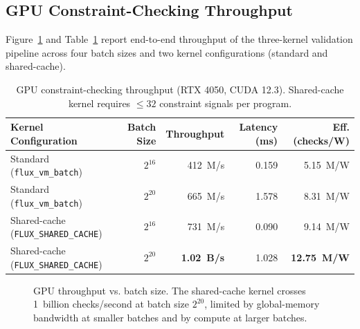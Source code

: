 \documentclass[sigplan,review,anonymous]{acmart}
\begin{document}
\subsection{GPU Constraint-Checking Throughput}
\label{sec:eval-gpu}

Figure~\ref{fig:gpu-throughput} and Table~\ref{tab:gpu-throughput} report
end-to-end throughput of the three-kernel validation pipeline across four
batch sizes and two kernel configurations (standard and shared-cache).

\begin{table}[t]
\centering
\caption{GPU constraint-checking throughput (RTX 4050, CUDA 12.3).
Shared-cache kernel requires $\le 32$ constraint signals per program.}
\label{tab:gpu-throughput}
\renewcommand{\arraystretch}{1.15}
\begin{tabular}{lrrrr}
\toprule
\textbf{Kernel Configuration} & \textbf{Batch Size} & \textbf{Throughput} &
\textbf{Latency (ms)} & \textbf{Eff. (checks/W)} \\
\midrule
Standard (\texttt{flux\_vm\_batch})       & $2^{16}$  & 412~M/s  & 0.159 & 5.15~M/W \\
Standard (\texttt{flux\_vm\_batch})       & $2^{20}$  & 665~M/s  & 1.578 & 8.31~M/W \\
Shared-cache (\texttt{FLUX\_SHARED\_CACHE}) & $2^{16}$ & 731~M/s  & 0.090 & 9.14~M/W \\
Shared-cache (\texttt{FLUX\_SHARED\_CACHE}) & $2^{20}$ & \textbf{1.02~B/s} & 1.028 & \textbf{12.75~M/W} \\
\bottomrule
\end{tabular}
\end{table}

\begin{figure}[t]
\centering
{}
\caption{GPU throughput vs. batch size. The shared-cache kernel crosses
1~billion checks/second at batch size $2^{20}$, limited by global-memory
bandwidth at smaller batches and by compute at larger batches.}
\label{fig:gpu-throughput}
\end{figure}
\end{document}
